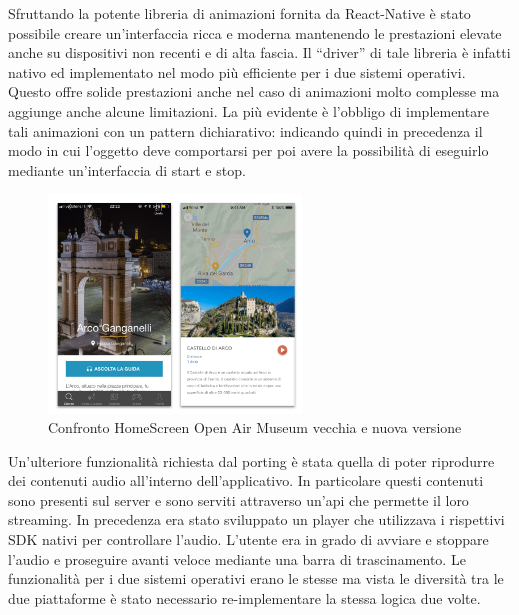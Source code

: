 Sfruttando la potente libreria di animazioni fornita da React-Native è stato possibile creare un'interfaccia ricca e moderna mantenendo le prestazioni elevate anche su dispositivi non recenti e di alta fascia. Il “driver” di tale libreria è infatti nativo ed implementato nel modo più efficiente per i due sistemi operativi. Questo offre solide prestazioni anche nel caso di animazioni molto complesse ma aggiunge anche alcune limitazioni. La più evidente è l’obbligo di implementare tali animazioni con un pattern dichiarativo: indicando quindi in precedenza il modo in cui l’oggetto deve comportarsi per poi avere la possibilità di eseguirlo mediante un'interfaccia di start e stop.

\begin{figure}[h]
\centering
\includegraphics[width=0.6\textwidth]{images/audio.png}
\caption{Confronto HomeScreen Open Air Museum vecchia e nuova versione}
\end{figure}

Un'ulteriore funzionalità richiesta dal porting è stata quella di poter riprodurre dei contenuti audio all’interno dell’applicativo. In particolare questi contenuti sono presenti sul server e sono serviti attraverso un'api che permette il loro streaming. In precedenza era stato sviluppato un player che utilizzava i rispettivi SDK nativi per controllare l’audio. L'utente era in grado di avviare e stoppare l’audio e proseguire avanti veloce mediante una barra di trascinamento. Le funzionalità per i due sistemi operativi erano le stesse ma vista le diversità tra le due piattaforme è stato necessario re-implementare la stessa logica due volte.\vspace{2mm}

